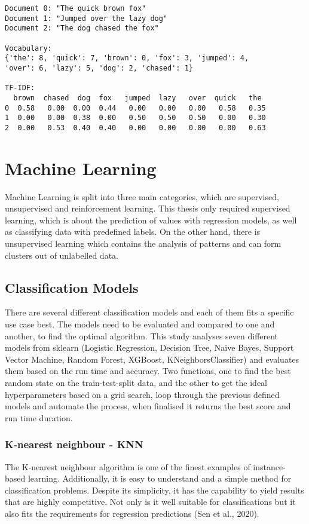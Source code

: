 \begin{verbatim}
Document 0: "The quick brown fox"
Document 1: "Jumped over the lazy dog"
Document 2: "The dog chased the fox"

Vocabulary: 
{'the': 8, 'quick': 7, 'brown': 0, 'fox': 3, 'jumped': 4,
'over': 6, 'lazy': 5, 'dog': 2, 'chased': 1}

TF-IDF:
  brown  chased  dog  fox   jumped  lazy   over  quick   the 
0  0.58   0.00  0.00  0.44   0.00   0.00   0.00   0.58   0.35  
1  0.00   0.00  0.38  0.00   0.50   0.50   0.50   0.00   0.30  
2  0.00   0.53  0.40  0.40   0.00   0.00   0.00   0.00   0.63   
\end{verbatim}

\section{Machine Learning}

Machine Learning is split into three main categories, which are supervised, unsupervised and reinforcement learning. This thesis only required supervised learning, which is about the prediction of values with regression models, as well as classifying data with predefined labels. On the other hand, there is unsupervised learning which contains the analysis of patterns and can form clusters out of unlabelled data.

\subsection{Classification Models}

There are several different classification models and each of them fits a specific use case best. 
The models need to be evaluated and compared to one and another, to find the optimal algorithm. This study analyses seven different models from sklearn (Logistic Regression, Decision Tree, Naive Bayes, Support Vector Machine, Random Forest, XGBoost, KNeighborsClassifier) and evaluates them based on the run time and accuracy. 
Two functions, one to find the best random state on the train-test-split data, and the other to get the ideal hyperparameters based on a grid search, loop through the previous defined models and automate the process, when finalised it returns the best score and run time duration.

\subsubsection{K-nearest neighbour - KNN}
The K-nearest neighbour algorithm is one of the finest examples of instance-based learning. Additionally, it is easy to understand and a simple method for classification problems. Despite its simplicity, it has the capability to yield results that are highly competitive. Not only is it well suitable for classifications but it also fits the requirements for regression predictions (Sen et al., 2020).

